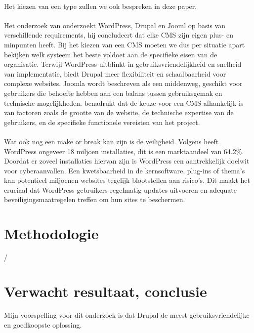 \\
Het kiezen van een type zullen we ook bespreken in deze paper.
\\ \\
Het onderzoek van \textcite{Khalil2024} onderzoekt WordPress, Drupal en Jooml op basis van verschillende requirements, hij concludeert dat elke CMS zijn eigen plus- en minpunten heeft. Bij het kiezen van een CMS moeten we dus per situatie apart bekijken welk systeem het beste voldoet aan de specifieke eisen van de organisatie. Terwijl WordPress uitblinkt in gebruiksvriendelijkheid en snelheid van implementatie, biedt Drupal meer flexibiliteit en schaalbaarheid voor complexe websites. Joomla wordt beschreven als een middenweg, geschikt voor gebruikers die behoefte hebben aan een balans tussen gebruiksgemak en technische mogelijkheden. \textcite{Khalil2024} benadrukt dat de keuze voor een CMS afhankelijk is van factoren zoals de grootte van de website, de technische expertise van de gebruikers, en de specifieke functionele vereisten van het project.
\\ \\
Wat ook nog een make or break kan zijn is de veiligheid. Volgens \textcite{MarianVladut2021} heeft WordPress ongeveer 18 miljoen installaties, dit is een marktaandeel van 64.2\%. Doordat er zoveel installaties hiervan zijn is WordPress een aantrekkelijk doelwit voor cyberaanvallen. Een kwetsbaarheid in de kernsoftware, plug-ins of thema's kan potentieel miljoenen websites tegelijk blootstellen aan risico's. Dit maakt het cruciaal dat WordPress-gebruikers regelmatig updates uitvoeren en adequate beveiligingsmaatregelen treffen om hun sites te beschermen.


\section{Methodologie}%
\label{sec:methodologie}

/

\section{Verwacht resultaat, conclusie}%
\label{sec:verwachte_resultaten}

Mijn voorspelling voor dit onderzoek is dat Drupal de meest gebruiksvriendelijke en goedkoopste oplossing.